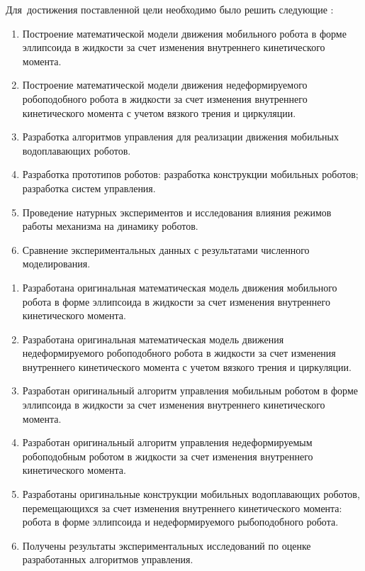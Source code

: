 
Для~достижения поставленной цели необходимо было решить следующие {\tasks}:
\begin{enumerate}
  \item Построение математической модели движения мобильного робота в форме эллипсоида в жидкости за счет изменения внутреннего кинетического момента.
  \item Построение математической модели движения недеформируемого робоподобного робота в жидкости за счет изменения внутреннего кинетического момента с учетом вязкого трения и циркуляции.
  \item Разработка алгоритмов управления для реализации движения мобильных водоплавающих роботов.
  \item Разработка прототипов роботов: разработка конструкции мобильных роботов; разработка систем управления.
  \item Проведение натурных экспериментов и исследования влияния режимов работы механизма на динамику роботов.
  \item Сравнение экспериментальных данных с результатами численного моделирования.
\end{enumerate}


{\novelty}
\begin{enumerate}
  \item Разработана оригинальная математическая модель движения мобильного робота в форме эллипсоида в жидкости за счет изменения внутреннего кинетического момента.
  \item Разработана оригинальная математическая модель движения недеформируемого робоподобного робота в жидкости за счет изменения внутреннего кинетического момента с учетом вязкого трения и циркуляции.
  \item Разработан оригинальный алгоритм управления мобильным роботом в форме эллипсоида в жидкости за счет изменения внутреннего кинетического момента.
  \item Разработан оригинальный алгоритм управления недеформируемым робоподобным роботом в жидкости за счет изменения внутреннего кинетического момента.
  \item Разработаны оригинальные конструкции мобильных водоплавающих роботов, перемещающихся за счет изменения внутреннего кинетического момента: робота в форме эллипсоида и недеформируемого рыбоподобного робота.
  \item Получены результаты экспериментальных исследований по оценке разработанных алгоритмов управления.
\end{enumerate}

